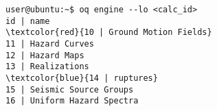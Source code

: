 \begin{Verbatim}[frame=single, commandchars=\\\{\}, fontsize=\small]
user@ubuntu:~$ oq engine --lo <calc_id>
id | name
\textcolor{red}{10 | Ground Motion Fields}
11 | Hazard Curves
12 | Hazard Maps
13 | Realizations
\textcolor{blue}{14 | ruptures}
15 | Seismic Source Groups
16 | Uniform Hazard Spectra
\end{Verbatim}
